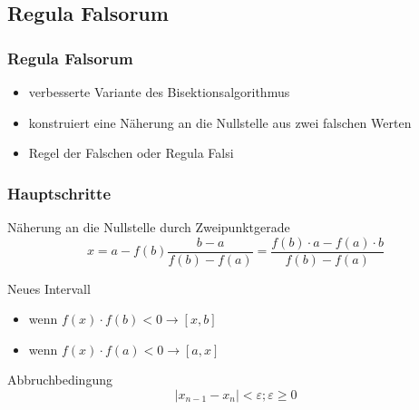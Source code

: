 \documentclass[table]{beamer}
\begin{document}
\subsection{Regula Falsorum}
\begin{frame}
\frametitle{Regula Falsorum}
\begin{itemize}
\item verbesserte Variante des Bisektionsalgorithmus 
\item konstruiert eine Näherung an die Nullstelle aus zwei falschen Werten
\item  Regel der Falschen oder Regula Falsi
\end {itemize}
\end{frame}
\begin{frame}
\frametitle{Hauptschritte}
\begin{block}{Näherung an die Nullstelle durch Zweipunktgerade}
$$x = a - f(b)\frac{b - a}{f(b)-  f(a)} = \frac{f(b)\cdot a - f(a)\cdot b}{f(b) - f(a)}$$
\end{block}
\begin{block}{Neues Intervall}
\begin{itemize}
\item wenn $f(x)\cdot f(b)<0 \to [x,b]$
\item wenn $f(x)\cdot f(a)< 0\to [a,x]$
\end{itemize}
\end{block}
\begin{block}{Abbruchbedingung}
$$|x_{n-1} - x_n|<\varepsilon ;   \varepsilon \geq 0$$
\end{block}        
\end{frame}	
\end{document}
